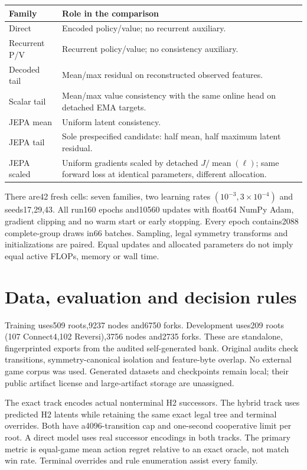 \documentclass[11pt,a4paper]{article}
\begin{document}
\begin{center}\small
\begin{tabular}{p{31mm}p{112mm}}
\toprule Family & Role in the comparison\\\midrule
Direct & Encoded policy/value; no recurrent auxiliary.\\
Recurrent P/V & Recurrent policy/value; no consistency auxiliary.\\
Decoded tail & Mean/max residual on reconstructed observed features.\\
Scalar tail & Mean/max value consistency with the same online head on detached EMA targets.\\
JEPA mean & Uniform latent consistency.\\
JEPA tail & Sole prespecified candidate: half mean, half maximum latent residual.\\
JEPA scaled & Uniform gradients scaled by detached $J/\operatorname{mean}(\ell)$;
same forward loss at identical parameters, different allocation.\\\bottomrule
\end{tabular}\end{center}

There are42 fresh cells: seven families, two learning rates $(10^{-3},3\times10^{-4})$
and seeds17,29,43. All run160 epochs and10560 updates with float64 NumPy Adam,
gradient clipping and no warm start or early stopping. Every epoch contains2088
complete-group draws in66 batches. Sampling, legal symmetry transforms and
initializations are paired. Equal updates and allocated parameters do not imply
equal active FLOPs, memory or wall time.

\section{Data, evaluation and decision rules}
Training uses509 roots,9237 nodes and6750 forks. Development uses209 roots
(107 Connect4,102 Reversi),3756 nodes and2735 forks. These are standalone,
fingerprinted exports from the audited self-generated bank. Original audits
check transitions, symmetry-canonical isolation and feature-byte overlap.
No external game corpus was used. Generated datasets and checkpoints remain
local; their public artifact license and large-artifact storage are unassigned.

The exact track encodes actual nonterminal H2 successors. The hybrid track uses
predicted H2 latents while retaining the same exact legal tree and terminal
overrides. Both have a4096-transition cap and one-second cooperative limit per
root. A direct model uses real successor encodings in both tracks. The primary
metric is equal-game mean action regret relative to an exact oracle, not match
win rate. Terminal overrides and rule enumeration assist every family.
\end{document}

